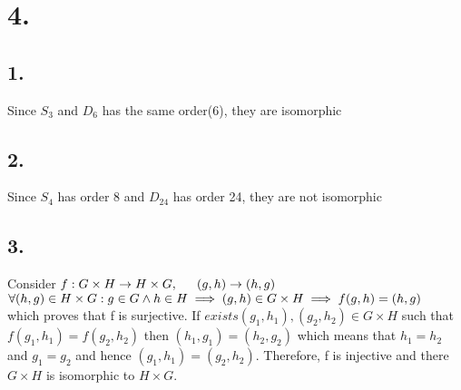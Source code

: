 \documentclass[11pt]{article}
\begin{document}
\section*{4.}
\subsection*{1.} 
Since $S_3$ and $D_6$ has the same order(6), they are isomorphic
\subsection*{2.}
Since $S_4$ has order 8 and $D_{24}$ has order 24, they are not isomorphic
\subsection*{3.}
Consider 
$f: G \times H \to H \times G, \indent  (g,h) \to (h,g) $ \\
$\forall (h,g) \in H \times G: g \in G \land h \in H \\
\implies (g,h) \in G \times H \\
\implies f(g,h) = (h,g)$ \\
which proves that f is surjective.
If $exists (g_1,h_1), (g_2,h_2) \in G \times H$ such that $f(g_1,h_1) = f(g_2,h_2)$ then
$(h_1,g_1) = (h_2,g_2)$ which means that $h_1 = h_2$ and $g_1 = g_2$ and hence $(g_1,h_1) = (g_2,h_2)$. Therefore, f is injective and there $G \times H$ is isomorphic to $H \times G$.
\end{document}
